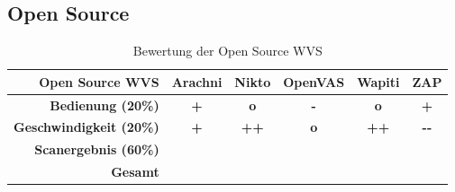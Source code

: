 \documentclass[12pt,oneside,a4paper,parskip]{scrbook}
\begin{document}
    \subsection{Open Source}
      \begin{table}[H]
        \centering
        \begin{tabular}{|r|c|c|c|c|c|}
        \hline
        \textbf{Open Source WVS}            & \textbf{Arachni} & \textbf{Nikto} & \textbf{OpenVAS} & \textbf{Wapiti} & \textbf{ZAP}  \\
        \hline
        \textbf{Bedienung (20\%)}       & \textbf{+}       & \textbf{o}     & \textbf{-}       & \textbf{o}      & \textbf{+}                 \\
        \hline
        \textbf{Geschwindigkeit (20\%)} & \textbf{+}       & \textbf{++}    & \textbf{o}       & \textbf{++}     & \textbf{-{}-}                \\
        \hline
        \textbf{Scanergebnis (60\%)}    &                  &                &                  &                 &                            \\
        \hline
        \textbf{Gesamt}                 &                  &                &                  &                 &                            \\
        \hline
        \end{tabular}
        \caption[Bewertung der Open Source WVS]{Bewertung der Open Source WVS}
      \end{table}
\end{document}

